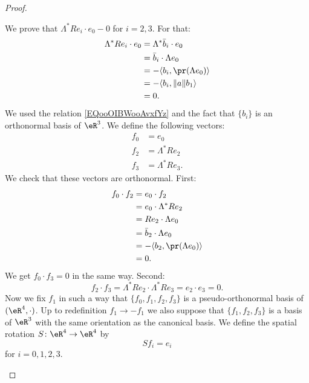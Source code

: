 \begin{proof}
\begin{subproof}
		We prove that \( \Lambda^*Re_i\cdot e_0-0\) for \( i=2,3\). For that:
		\begin{subequations}
			\begin{align}
				\Lambda^*Re_i\cdot e_0 & =\Lambda^*\bar b_i\cdot e_0            \\
				                       & =\bar b_i\cdot \Lambda e_0             \\
				                       & =-\langle b_i, \pr(\Lambda e_0)\rangle \\
				                       & =-\langle b_i, \| a \|  b_1\rangle     \\
				                       & =0.
			\end{align}
		\end{subequations}
		We used the relation \eqref{EQooOIBWooAvxfYz} and the fact that \( \{ b_i \} \) is an orthonormal basis of \( \eR^3\).
		We define the following vectors:
		\begin{subequations}
			\begin{align}
				f_0 & =e_0            \\
				f_2 & =\Lambda^*Re_2  \\
				f_3 & =\Lambda^*Re_3.
			\end{align}
		\end{subequations}
		We check that these vectors are orthonormal. First:
		\begin{subequations}
			\begin{align}
				f_0\cdot f_2 & =e_0\cdot f_2                          \\
				             & =e_0\cdot \Lambda^*Re_2                \\
				             & = Re_2\cdot \Lambda e_0                \\
				             & =\bar b_2\cdot \Lambda e_0             \\
				             & =-\langle b_2, \pr(\Lambda e_0)\rangle \\
				             & =0.
			\end{align}
		\end{subequations}
		We get \( f_0\cdot f_3=0\) in the same way. Second:
		\begin{equation}
			f_2\cdot f_3=\Lambda^*Re_2\cdot \Lambda^*Re_3=e_2\cdot e_3=0.
		\end{equation}
		Now we fix \( f_1\) in such a way that \( \{ f_0,f_1,f_2,f_3 \}\) is a pseudo-orthonormal basis of \( (\eR^4,\cdot)\). Up to redefinition \( f_1\to -f_1\) we also suppose that \( \{ f_1,f_2,f_3 \}\) is a basis of \( \eR^3\) with the same orientation as the canonical basis.
		We define the spatial rotation \( S\colon \eR^4\to \eR^4\) by
		\begin{equation}
			Sf_i=e_i
		\end{equation}
		for \( i=0,1,2,3\).


\end{subproof}
\end{proof}
